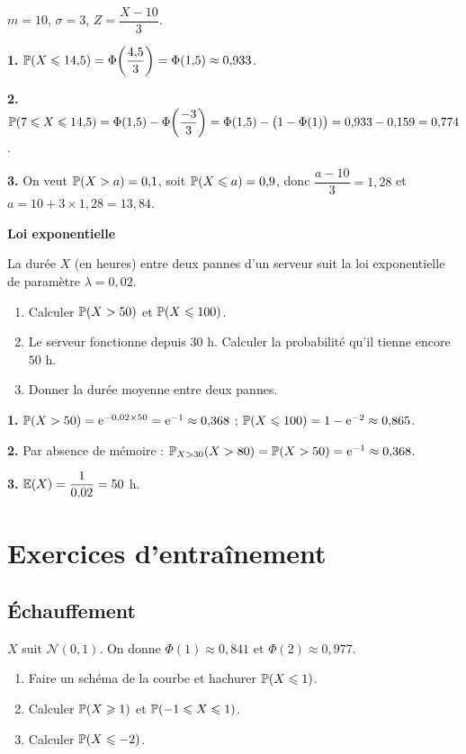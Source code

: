 \solution

$m=10$, $\sigma=3$, $Z=\dfrac{X-10}{3}$.

\textbf{1.} $\mathbb{P}(X\leqslant 14{,}5)=\Phi\!\left(\dfrac{4{,}5}{3}\right)
=\Phi(1{,}5)\approx 0{,}933$.

\textbf{2.} $\mathbb{P}(7\leqslant X\leqslant 14{,}5)
=\Phi(1{,}5)-\Phi\!\left(\dfrac{-3}{3}\right)
=\Phi(1{,}5)-\bigl(1-\Phi(1)\bigr)
= 0{,}933-0{,}159 = 0{,}774$.

\textbf{3.} On veut $\mathbb{P}(X>a)=0{,}1$, soit $\mathbb{P}(X\leqslant a)=0{,}9$, donc
$\dfrac{a-10}{3}=1{,}28$ et $a = 10+3\times1{,}28 = 13{,}84$.

\exerciceresolu
\textbf{Loi exponentielle}

La durée $X$ (en heures) entre deux pannes d'un serveur suit la loi
exponentielle de paramètre $\lambda = 0{,}02$.
\begin{enumerate}
	\item Calculer $\mathbb{P}(X>50)$ et $\mathbb{P}(X\leqslant 100)$.
	\item Le serveur fonctionne depuis $30$ h. Calculer la probabilité qu'il
	tienne encore $50$ h.
	\item Donner la durée moyenne entre deux pannes.
\end{enumerate}

\solution

\textbf{1.} $\mathbb{P}(X>50)=\mathrm{e}^{-0{,}02\times 50}=\mathrm{e}^{-1}\approx 0{,}368$ ;
$\mathbb{P}(X\leqslant 100)=1-\mathrm{e}^{-2}\approx 0{,}865$.

\textbf{2.} Par absence de mémoire :
$\mathbb{P}_{X>30}(X>80)=\mathbb{P}(X>50)=\mathrm{e}^{-1}\approx 0{,}368$.

\textbf{3.} $\mathbb{E}(X)=\dfrac{1}{0{,}02}=50$ h.


\section{Exercices d'entraînement}

\subsection{Échauffement}

$X$ suit $\mathscr{N}(0,1)$. On donne $\Phi(1)\approx 0{,}841$ et
$\Phi(2)\approx 0{,}977$.
\begin{enumerate}
	\item Faire un schéma de la courbe et hachurer $\mathbb{P}(X\leqslant 1)$.
	\item Calculer $\mathbb{P}(X\geqslant 1)$ et $\mathbb{P}(-1\leqslant X\leqslant 1)$.
	\item Calculer $\mathbb{P}(X\leqslant -2)$.
\end{enumerate}


